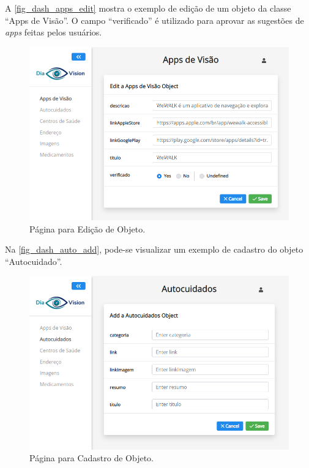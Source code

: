 A \autoref{fig_dash_apps_edit} mostra o exemplo de edição de um objeto da classe ``Apps de Visão''. O campo ``verificado''
é utilizado para aprovar as sugestões de \emph{apps} feitas pelos usuários.

\begin{figure}[htb]
    \caption{\label{fig_dash_apps_edit}Página para Edição de Objeto.}
    \begin{center}
        \includegraphics[scale=0.53]{Imagens/desenvolvimento/apps_visao_edit_admin.png}
    \end{center}
\end{figure}

Na \autoref{fig_dash_auto_add}, pode-se visualizar um exemplo de cadastro do objeto ``Autocuidado''.

\begin{figure}[htb]
    \caption{\label{fig_dash_auto_add}Página para Cadastro de Objeto.}
    \begin{center}
        \includegraphics[scale=0.53]{Imagens/desenvolvimento/autocuidados_add_admin.png}
    \end{center}
\end{figure}

